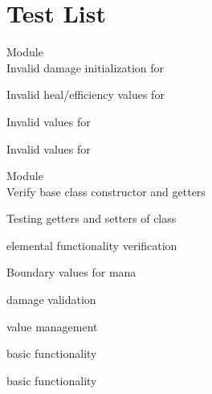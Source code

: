 \chapter{Test List}
\hypertarget{test}{}\label{test}

\begin{DoxyRefList}
\item[Module \doxylink{group__ErrorHandling}{Error\+Handling} ]\hfill \\
\label{test__test000006}%
%
Invalid damage initialization for   



\label{test__test000008}%
%
Invalid heal/efficiency values for   



\label{test__test000010}%
%
Invalid values for   



\label{test__test000012}%
%
Invalid values for   


\item[Module \doxylink{group__GCI}{GCI} ]\hfill \\
\label{test__test000001}%
%
Verify base  class constructor and getters  



\label{test__test000002}%
%
Testing getters and setters of  class  



\label{test__test000003}%
%
 elemental functionality verification  



\label{test__test000004}%
%
Boundary values for  mana  



\label{test__test000005}%
%
 damage validation  



\label{test__test000007}%
%
 value management  



\label{test__test000009}%
%
 basic functionality  



\label{test__test000011}%
%
 basic functionality  


\end{DoxyRefList}